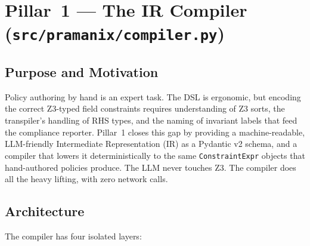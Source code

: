 \documentclass[12pt,a4paper,oneside]{report}
\newcommand{\fname}[1]{\texttt{#1}}          %
\newcommand{\code}[1]{\texttt{#1}}           %
\begin{document}
\section{Pillar~1 --- The IR Compiler (\fname{src/pramanix/compiler.py})}

\subsection{Purpose and Motivation}

Policy authoring by hand is an expert task.  The DSL is ergonomic, but
encoding the correct Z3-typed field constraints requires understanding of
Z3 sorts, the transpiler's handling of RHS types, and the naming of invariant
labels that feed the compliance reporter.  Pillar~1 closes this gap by
providing a machine-readable, LLM-friendly Intermediate Representation (IR)
as a Pydantic v2 schema, and a compiler that lowers it deterministically to
the same \code{ConstraintExpr} objects that hand-authored policies produce.
The LLM never touches Z3.  The compiler does all the heavy lifting, with
zero network calls.

\subsection{Architecture}

The compiler has four isolated layers:
\end{document}
